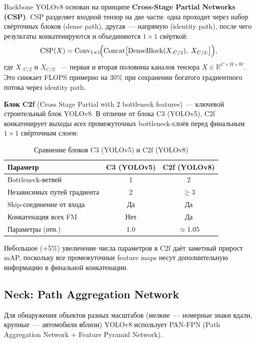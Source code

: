 \documentclass[14pt,a4paper]{report}
\numberwithin{equation}{chapter}
\numberwithin{figure}{chapter}
\numberwithin{table}{chapter}
\begin{document}
Backbone YOLOv8 основан на принципе \textbf{Cross-Stage Partial
Networks (CSP)}. CSP разделяет входной тензор на две части:
одна проходит через набор свёрточных блоков (dense path),
другая~--- напрямую (identity path), после чего результаты
конкатенируются и объединяются $1\times1$ свёрткой:
\begin{equation}
  \mathrm{CSP}(X) =
    \mathrm{Conv}_{1\times1}\!\Bigl(
      \mathrm{Concat}\bigl[
        \mathrm{DenseBlock}(X_{:C/2}),\;
        X_{C/2:}
      \bigr]
    \Bigr),
\end{equation}
где $X_{:C/2}$ и $X_{C/2:}$~--- первая и вторая половины каналов
тензора $X \in \mathbb{R}^{C \times H \times W}$.
Это снижает FLOPS примерно на 30\% при сохранении богатого
градиентного потока через identity path.

\textbf{Блок C2f} (Cross Stage Partial with 2 bottleneck features)~---
ключевой строительный блок YOLOv8. В отличие от блока C3 (YOLOv5),
C2f конкатенирует выходы \textit{всех} промежуточных bottleneck-слоёв
перед финальным $1\times1$ свёрточным слоем:

\begin{table}[H]
\centering
\caption{Сравнение блоков C3 (YOLOv5) и C2f (YOLOv8)}
\label{tab:c2f}
\begin{tabular}{lcc}
\toprule
\textbf{Параметр} & \textbf{C3 (YOLOv5)} & \textbf{C2f (YOLOv8)} \\
\midrule
Bottleneck-ветвей           & 1   & 2 \\
Независимых путей градиента & 2   & $\geq 3$ \\
Skip-соединение от входа    & Да  & Да \\
Конкатенация всех FM        & Нет & Да \\
Параметры (отн.)            & 1.0 & $\approx$1.05 \\
\bottomrule
\end{tabular}
\end{table}

Небольшое (+5\%) увеличение числа параметров в C2f даёт заметный
прирост mAP, поскольку все промежуточные feature maps несут
дополнительную информацию в финальной конкатенации.

\subsection{Neck: Path Aggregation Network}

Для обнаружения объектов разных масштабов (мелкие~--- номерные
знаки вдали, крупные~--- автомобили вблизи) YOLOv8 использует
PAN-FPN (Path Aggregation Network + Feature Pyramid Network).
\end{document}
